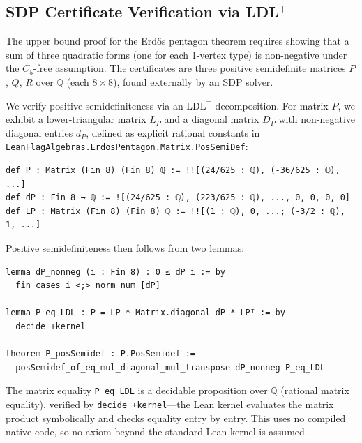 \documentclass{article}
\newcommand{\Q}{\mathbb{Q}}
\newcommand{\lean}[1]{\texttt{#1}}
\begin{document}
\subsection{SDP Certificate Verification via LDL$^\top$}
\label{sec:sdp}

The upper bound proof for the Erd\H{o}s pentagon theorem requires showing
that a sum of three quadratic forms (one for each 1-vertex type) is
non-negative under the $C_5$-free assumption.  The certificates are three
positive semidefinite matrices $P$, $Q$, $R$ over $\Q$ (each $8 \times 8$),
found externally by an SDP solver.

We verify positive semidefiniteness via an LDL$^\top$ decomposition.  For
matrix $P$, we exhibit a lower-triangular matrix $L_P$ and a diagonal matrix
$D_P$ with non-negative diagonal entries $d_P$, defined as explicit rational
constants in \lean{LeanFlagAlgebras.ErdosPentagon.Matrix.PosSemiDef}:
\begin{lstlisting}
def P : Matrix (Fin 8) (Fin 8) ℚ := !![(24/625 : ℚ), (-36/625 : ℚ), ...]
def dP : Fin 8 → ℚ := ![(24/625 : ℚ), (223/625 : ℚ), ..., 0, 0, 0, 0]
def LP : Matrix (Fin 8) (Fin 8) ℚ := !![(1 : ℚ), 0, ...; (-3/2 : ℚ), 1, ...]
\end{lstlisting}
Positive semidefiniteness then follows from two lemmas:
\begin{lstlisting}
lemma dP_nonneg (i : Fin 8) : 0 ≤ dP i := by
  fin_cases i <;> norm_num [dP]

lemma P_eq_LDL : P = LP * Matrix.diagonal dP * LPᵀ := by
  decide +kernel

theorem P_posSemidef : P.PosSemidef :=
  posSemidef_of_eq_mul_diagonal_mul_transpose dP_nonneg P_eq_LDL
\end{lstlisting}
The matrix equality \lean{P\_eq\_LDL} is a decidable proposition over $\Q$
(rational matrix equality), verified by \lean{decide +kernel}---the Lean
kernel evaluates the matrix product symbolically and checks equality entry by
entry.  This uses no compiled native code, so no axiom beyond the standard
Lean kernel is assumed.
\end{document}
